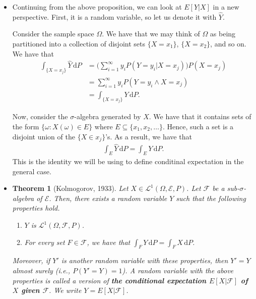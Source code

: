 \documentclass[10pt]{article}
\newtheorem{theorem}[lemma]{Theorem}
\numberwithin{lemma}{section}
\newcommand{\dee}{\mathrm{d}}
\newcommand{\mcal}[1]{\mathcal{#1}}
\begin{document}
\begin{itemize}
  \item Continuing from the above proposition, we can look at $E[Y|X]$ in a new perspective. First, it is a random variable, so let us denote it with $\hat{Y}$.
  
  Consider the sample space $\Omega$. We have that we may think of $\Omega$ as being partitioned into a collection of disjoint sets $\{ X = x_1 \}$, $\{ X = x_2 \}$, and so on. We have that
  \begin{align*}
    \int_{\{ X = x_j \}} \hat{Y}\, \dee P
    &= \bigg( \sum_{i=1}^\infty y_i P(Y = y_i|X=x_j)\bigg) P(X = x_j)\\
    &= \sum_{i=1}^\infty y_i P(Y = y_i \wedge X = x_j) \\
    &= \int_{\{ X = x_j \}} Y \, \dee P.
  \end{align*}
  
  Now, consider the $\sigma$-algebra generated by $X$. We have that it contains sets of the form $\{ \omega: X(\omega) \in E \}$ where $E \subseteq \{ x_1, x_2, \dotsc \}$. Hence, such a set is a disjoint union of the $\{ X \in x_j \}$'s. As a result, we have that
  \begin{align*}
    \int_E \hat{Y}\, \dee P = \int_E Y \, \dee P.
  \end{align*}
  This is the identity we will be using to define conditinal expectation in the general case.

  \item \begin{theorem}[Kolmogorov, 1933] \label{thm:conditional-expectation}
    Let $X \in \mcal{L}^1(\Omega, \mcal{E}, P)$. Let $\mcal{F}$ be a sub-$\sigma$-algebra of $\mcal{E}$. Then, there exists a random variable $Y$ such that the following properties hold.
    \begin{enumerate}
      \item $Y$ is $\mcal{L}^1(\Omega, \mcal{F}, P)$.
      \item For every set $F \in \mcal{F}$, we have that $\int_F Y\, \dee P = \int_F X\, \dee P$.
    \end{enumerate}
    Moreover, if $Y'$ is another random variable with these properties, then $Y' = Y$ almost surely (i.e., $P(Y' = Y) = 1$). A random variable with the above properties is called a version of {\bf the conditional expectation $E[X|\mcal{F}]$ of $X$ given $\mcal{F}$}. We write $Y = E[X|\mcal{F}]$. 
  \end{theorem} 


\end{itemize}
\end{document}
